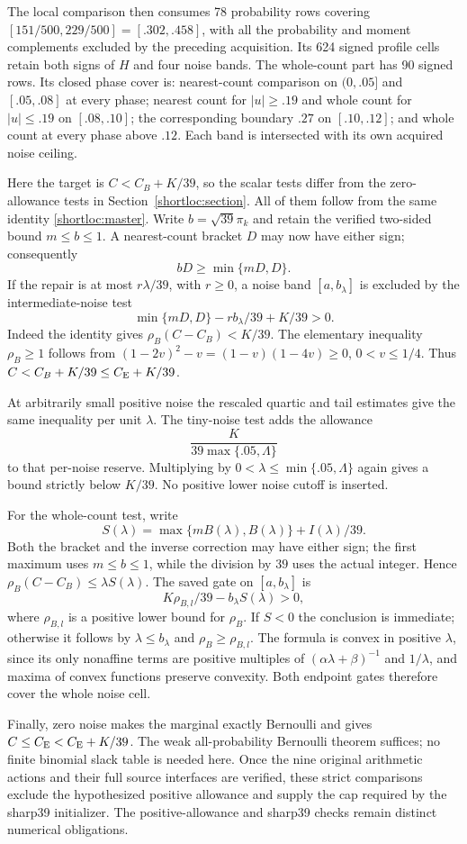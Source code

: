 The local comparison then consumes 78 probability rows covering
$[151/500,229/500]=[.302,.458]$, with all the probability and moment
complements excluded by the preceding acquisition. Its 624 signed
profile cells retain both signs of $H$ and four noise bands. The
whole-count part has 90 signed rows. Its closed phase cover is:
nearest-count comparison on $(0,.05]$ and $[.05,.08]$ at every
phase; nearest count for $|u|\ge.19$ and whole count for
$|u|\le.19$ on $[.08,.10]$; the corresponding boundary $.27$ on
$[.10,.12]$; and whole count at every phase above $.12$.
Each band is intersected with its own acquired noise ceiling.

Here the target is $C< C_B+K/39$, so the scalar tests differ from
the zero-allowance tests in Section~\ref{shortloc:section}.
All of them follow from the same identity
\eqref{shortloc:master}. Write $b=\sqrt{39}\pi_k$ and retain
the verified two-sided bound $m\le b\le1$. A nearest-count
bracket $D$ may now have either sign; consequently
\[
 bD\ge\min\{mD,D\}.
\]
If the repair is at most $r\lambda/39$, with $r\ge0$, a noise
band $[a,b_\lambda]$ is excluded by the intermediate-noise test
\[
 \min\{mD,D\}-r b_\lambda/39+K/39>0.
\]
Indeed the identity gives $\rho_B(C-C_B)<K/39$.
The elementary inequality $\rho_B\ge1$ follows from
$(1-2v)^2-v=(1-v)(1-4v)\ge0$, $0<v\le1/4$.
Thus $C<C_B+K/39\le C_{\mathrm E}+K/39$.

At arbitrarily small positive noise the rescaled quartic and tail
estimates give the same inequality per unit $\lambda$. The tiny-noise
test adds the allowance
\[
             \frac{K}{39\max\{.05,\Lambda\}}
\]
to that per-noise reserve. Multiplying by
$0<\lambda\le\min\{.05,\Lambda\}$ again gives a bound
strictly below $K/39$. No positive lower noise cutoff is inserted.

For the whole-count test, write
\[
 S(\lambda)=\max\{mB(\lambda),B(\lambda)\}
                         +I(\lambda)/39.
\]
Both the bracket and the inverse correction may have either sign;
the first maximum uses $m\le b\le1$, while the division by $39$
uses the actual integer. Hence
$\rho_B(C-C_B)\le\lambda S(\lambda)$.
The saved gate on $[a,b_\lambda]$ is
\[
        K\rho_{B,l}/39-b_\lambda S(\lambda)>0,
\]
where $\rho_{B,l}$ is a positive lower bound for $\rho_B$.
If $S<0$ the conclusion is immediate; otherwise it follows by
$\lambda\le b_\lambda$ and $\rho_B\ge\rho_{B,l}$.
The formula is convex in positive $\lambda$, since its only
nonaffine terms are positive multiples of
$(\alpha\lambda+\beta)^{-1}$ and $1/\lambda$, and maxima of
convex functions preserve convexity. Both endpoint gates therefore
cover the whole noise cell.

Finally, zero noise makes the marginal exactly Bernoulli and gives
$C\le C_{\mathrm E}<C_{\mathrm E}+K/39$. The weak all-probability Bernoulli theorem
suffices; no finite binomial slack table is needed here. Once the
nine original arithmetic actions and their full source interfaces
are verified, these strict comparisons exclude the hypothesized
positive allowance and supply the cap required by the sharp39
initializer. The positive-allowance and sharp39 checks remain
distinct numerical obligations.
